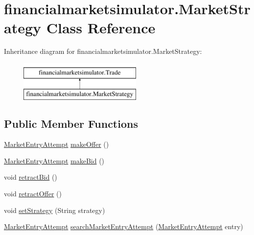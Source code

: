 \hypertarget{classfinancialmarketsimulator_1_1_market_strategy}{\section{financialmarketsimulator.\+Market\+Strategy Class Reference}
\label{classfinancialmarketsimulator_1_1_market_strategy}
}
Inheritance diagram for financialmarketsimulator.\+Market\+Strategy\+:\begin{figure}[H]
\begin{center}
\leavevmode
\includegraphics[height=2.000000cm]{classfinancialmarketsimulator_1_1_market_strategy}
\end{center}
\end{figure}
\subsection*{Public Member Functions}
\begin{DoxyCompactItemize}
\item 
\hyperlink{classfinancialmarketsimulator_1_1_market_entry_attempt}{Market\+Entry\+Attempt} \hyperlink{classfinancialmarketsimulator_1_1_market_strategy_a82e5b65bef66ffadea8085e3ca107130}{make\+Offer} ()
\item 
\hyperlink{classfinancialmarketsimulator_1_1_market_entry_attempt}{Market\+Entry\+Attempt} \hyperlink{classfinancialmarketsimulator_1_1_market_strategy_a2a518f43a8460feab62ef5c31d0e02c9}{make\+Bid} ()
\item 
void \hyperlink{classfinancialmarketsimulator_1_1_market_strategy_ab7bbd10cab2e86f3c48c81bbb4c058e2}{retract\+Bid} ()
\item 
void \hyperlink{classfinancialmarketsimulator_1_1_market_strategy_aa3e0b344b5025ab9aa4a36df70b48ec3}{retract\+Offer} ()
\item 
void \hyperlink{classfinancialmarketsimulator_1_1_market_strategy_ae65923e56266106ecb5b4b7f89a4e70b}{set\+Strategy} (String strategy)
\item 
\hyperlink{classfinancialmarketsimulator_1_1_market_entry_attempt}{Market\+Entry\+Attempt} \hyperlink{classfinancialmarketsimulator_1_1_market_strategy_ac773269f4e29a7b1099b3495d1781823}{search\+Market\+Entry\+Attempt} (\hyperlink{classfinancialmarketsimulator_1_1_market_entry_attempt}{Market\+Entry\+Attempt} entry)
\end{DoxyCompactItemize}


